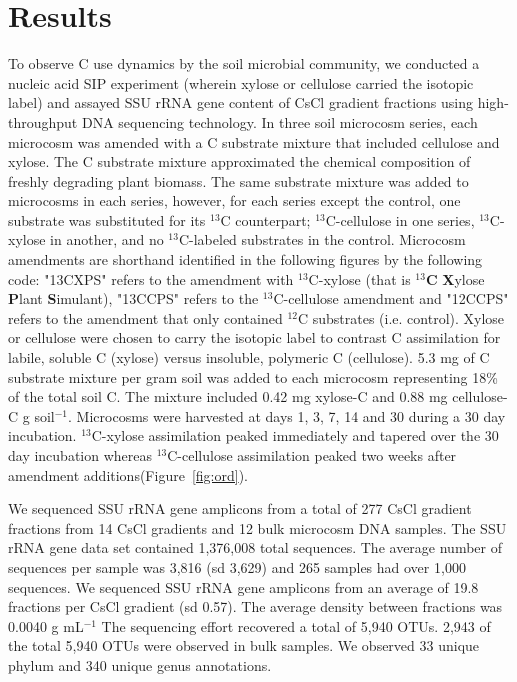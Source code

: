 \section{Results}
To observe C use dynamics by the soil microbial community, we conducted a
nucleic acid SIP experiment (wherein xylose or cellulose carried the isotopic
label) and assayed SSU rRNA gene content of CsCl gradient fractions using
high-throughput DNA sequencing technology. In three soil microcosm
series, each microcosm was amended with a C substrate mixture
that included cellulose and xylose. The C substrate mixture approximated
the chemical composition of freshly degrading plant biomass. The same substrate mixture was added to microcosms in each series, however, for each series except the control, one
substrate was substituted for its $^{13}$C counterpart; $^{13}$C-cellulose in one series, $^{13}$C-xylose in another, and no $^{13}$C-labeled substrates in the control. Microcosm amendments are shorthand identified in the following figures by the following code: "13CXPS" refers to the amendment with $^{13}$C-xylose (that is $^{13}$\textbf{C} \textbf{X}ylose
\textbf{P}lant \textbf{S}imulant), "13CCPS" refers to the $^{13}$C-cellulose amendment and "12CCPS" refers to the amendment that only contained $^{12}$C substrates (i.e. control). Xylose or cellulose were chosen to carry the isotopic label to contrast C assimilation for labile, soluble C (xylose) versus insoluble, polymeric C (cellulose).  5.3 mg of C substrate mixture per gram soil was added to each microcosm representing 18\% of the total soil C. The mixture included
0.42 mg xylose-C and 0.88 mg cellulose-C g soil$^{-1}$.  Microcosms were harvested at days 1, 3, 7, 14 and 30  during a 30 day incubation. $^{13}$C-xylose assimilation peaked immediately and tapered over the 30 day incubation whereas $^{13}$C-cellulose assimilation peaked two weeks after amendment additions(Figure~\ref{fig:ord}).

We sequenced SSU rRNA gene amplicons from a total of 277 CsCl gradient
fractions from 14 CsCl gradients and 12 bulk microcosm DNA samples. The SSU
rRNA gene data set contained 1,376,008 total sequences. The average number of
sequences per sample was 3,816 (sd 3,629) and 265 samples had over 1,000
sequences. We sequenced SSU rRNA gene amplicons from an average of 19.8
fractions per CsCl gradient (sd 0.57). The average density between fractions
was  0.0040 g mL$^{-1}$ The sequencing effort recovered a total of 5,940 OTUs.
2,943 of the total 5,940 OTUs were observed in bulk samples. We observed 33
unique phylum and 340 unique genus annotations.

